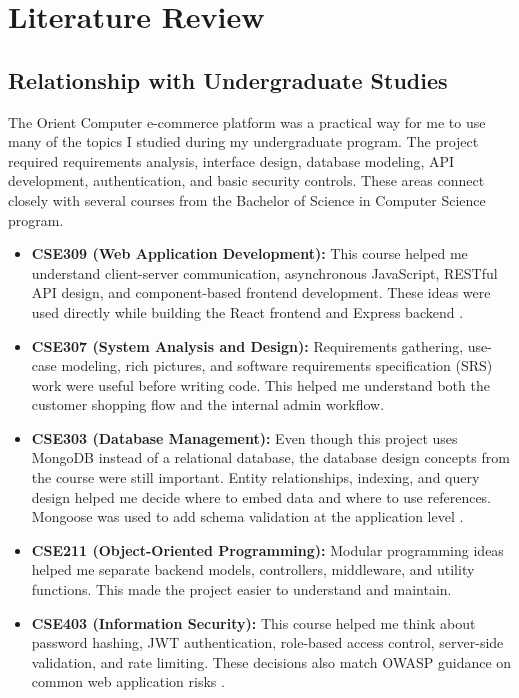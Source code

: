 \documentclass[12pt,a4paper,oneside]{report}
\begin{document}
\chapter{Literature Review}

\section{Relationship with Undergraduate Studies}
The Orient Computer e-commerce platform was a practical way for me to use many of the topics I studied during my undergraduate program. The project required requirements analysis, interface design, database modeling, API development, authentication, and basic security controls. These areas connect closely with several courses from the Bachelor of Science in Computer Science program.

\begin{itemize}
    \item \textbf{CSE309 (Web Application Development):} This course helped me understand client-server communication, asynchronous JavaScript, RESTful API design, and component-based frontend development. These ideas were used directly while building the React frontend and Express backend \cite{react,express}.
    \item \textbf{CSE307 (System Analysis and Design):} Requirements gathering, use-case modeling, rich pictures, and software requirements specification (SRS) work were useful before writing code. This helped me understand both the customer shopping flow and the internal admin workflow.
    \item \textbf{CSE303 (Database Management):} Even though this project uses MongoDB instead of a relational database, the database design concepts from the course were still important. Entity relationships, indexing, and query design helped me decide where to embed data and where to use references. Mongoose was used to add schema validation at the application level \cite{mongoose}.
    \item \textbf{CSE211 (Object-Oriented Programming):} Modular programming ideas helped me separate backend models, controllers, middleware, and utility functions. This made the project easier to understand and maintain.
    \item \textbf{CSE403 (Information Security):} This course helped me think about password hashing, JWT authentication, role-based access control, server-side validation, and rate limiting. These decisions also match OWASP guidance on common web application risks \cite{owasp}.
\end{itemize}
\end{document}

